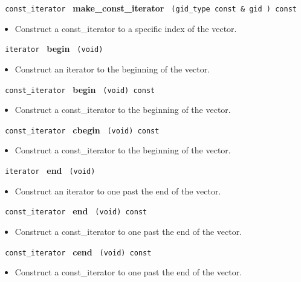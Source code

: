 \noindent
\texttt{%
const\_iterator 
}
\textbf{make\_const\_iterator}%
\texttt{%
(gid\_type const \&
gid
) const
}

\begin{itemize}
\item
Construct a const\_iterator to a specific index of the vector.
\end{itemize}
 
\noindent
\texttt{%
iterator
}
\textbf{begin}%
\texttt{%
(void)
}

\begin{itemize}
\item
Construct an iterator to the beginning of the vector.
\end{itemize}
 
\noindent
\texttt{%
const\_iterator
}
\textbf{begin}%
\texttt{%
(void) const
}

\begin{itemize}
\item
Construct a const\_iterator to the beginning of the vector.
\end{itemize}
 
\noindent
\texttt{%
const\_iterator
}
\textbf{cbegin}%
\texttt{%
(void) const
}

\begin{itemize}
\item
Construct a const\_iterator to the beginning of the vector.
\end{itemize}
 
\noindent
\texttt{%
iterator
}
\textbf{end}%
\texttt{%
(void)
}

\begin{itemize}
\item
Construct an iterator to one past the end of the vector.
\end{itemize}
 
\noindent
\texttt{%
const\_iterator
}
\textbf{end}%
\texttt{%
(void) const
}

\begin{itemize}
\item
Construct a const\_iterator to one past the end of the vector.
\end{itemize}
 
\noindent
\texttt{%
const\_iterator
}
\textbf{cend}%
\texttt{%
(void) const
}

\begin{itemize}
\item
Construct a const\_iterator to one past the end of the vector.
\end{itemize}

